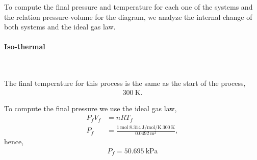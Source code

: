 \documentclass[main.tex]{subfiles}
\begin{document}
To compute the final pressure and temperature for each one of the systems and the relation pressure-volume for the diagram, we analyze the internal change of both systems and the ideal gas law.

\paragraph{Iso-thermal}~

The final temperature for this process is the same as the start of the process,
\begin{gather*}
    \boxed{\SI{300}{\kelvin}.}
\end{gather*}

To compute the final pressure we use the ideal gas law,
\begin{align*}
    P_fV_f &= nRT_f \\
    P_f &= \frac{\SI{1}{\mol}~\SI{8.314}{\joule\per\mol\per\kelvin}~\SI{300}{\kelvin}}{\SI{0.0492}{\meter\tothe{3}}},
\end{align*}
hence,
\begin{gather*}
    \boxed{P_f = \SI{50.695}{\kilo\pascal}}
\end{gather*}
\end{document}
